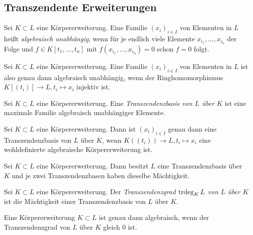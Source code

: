 \subsection{Transzendente Erweiterungen}

\begin{definition}
	Sei \(K \subset L\) eine Körpererweiterung. Eine Familie \((x_i)_{i \in I}\)
	von	Elementen in \(L\) heißt \emph{algebraisch unabhängig}, wenn 
	für je endlich
	viele Elemente \(x_{i_1}, \dotsc, x_{i_n}\) der Folge und \(f \in K[t_1, \dotsc, t_n]\)
	mit \(f(x_{i_1}, \dotsc, x_{i_n}) = 0\) schon \(f = 0\) folgt.
\end{definition}

\begin{remark}
	Sei \(K \subset L\) eine Körpererweiterung. Eine Familie \((x_i)_{i \in I}\)
	von Elementen in \(L\) ist also genau dann algebraisch unabhängig, wenn
	der Ringhomomorphismus \(K[(t_i)] \to L, t_i \mapsto x_i\) injektiv ist.
\end{remark}

\begin{definition}
	Sei \(K \subset L\) eine Körpererweiterung. Eine \emph{Transzendenzbasis
	von \(L\) über \(K\)} ist eine maximale Familie algebraisch unabhängiger
	Elemente.
\end{definition}

\begin{remark}
	Sei \(K \subset L\) eine Körpererweiterung. Dann ist \((x_i)_{i \in I}\)
	genau dann eine Transzendenzbasis von \(L\) über \(K\), wenn
	\(K((t_i)) \to L, t_i \mapsto x_i\) eine wohldefinierte algebraische
	Körpererweiterung ist.
\end{remark}

\begin{proposition}
	Sei \(K \subset L\) eine Körpererweiterung. Dann besitzt \(L\) eine
	Transzendenzbasis über \(K\) und je zwei Transzendenzbasen haben dieselbe
	Mächtigkeit.
\end{proposition}

\begin{definition}
	Sei \(K \subset L\) eine Körpererweiterung. Der
	\emph{Transzendenzgrad \(\operatorname{trdeg}_K L\) von
	\(L\) über \(K\)} ist die Mächtigkeit einer Transzendenzbasis von \(L\)
	über \(K\).
\end{definition}

\begin{example}
	Eine Körpererweiterung \(K \subset L\) ist genau dann algebraisch, wenn
	der Transzendenzgrad von \(L\) über \(K\) gleich \(0\) ist.
\end{example}

